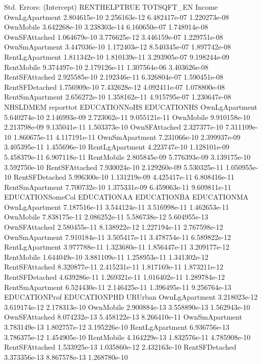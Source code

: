 \documentclass{article}
\begin{document}
\begin{Schunk}
\begin{Soutput}
Std. Errors:
                 (Intercept) RENTHELPTRUE   TOTSQFT_EN       Income
OwnLgApartment  2.804615e-10 2.256163e-12 6.482417e-07 1.220273e-08
OwnMobile       3.642268e-10 3.238303e-14 6.160650e-07 1.748914e-08
OwnSFAttached   1.064679e-10 3.776625e-12 3.446159e-07 1.229751e-08
OwnSmApartment  3.447036e-10 1.172403e-12 8.540345e-07 1.897742e-08
RentLgApartment 1.811342e-10 1.810139e-11 3.293905e-07 9.198244e-09
RentMobile      9.374497e-10 2.179126e-11 1.307564e-06 3.403626e-08
RentSFAttached  2.925585e-10 2.192346e-11 6.326804e-07 1.590451e-08
RentSFDetached  1.756909e-10 7.432628e-12 4.092411e-07 1.078800e-08
RentSmApartment 2.656272e-10 1.358162e-11 4.915795e-07 1.230647e-08
                    NHSLDMEM    reporttot EDUCATIONNoHS  EDUCATIONHS
OwnLgApartment  5.640274e-10 2.146993e-09  2.723062e-11 9.055121e-11
OwnMobile       9.910158e-10 2.213798e-09  9.135041e-11 1.503373e-10
OwnSFAttached   2.327377e-10 7.311109e-10  1.860675e-11 4.117191e-11
OwnSmApartment  7.231066e-10 2.399937e-09  3.405395e-11 1.455696e-10
RentLgApartment 4.223747e-10 1.128101e-09  5.458379e-11 6.907118e-11
RentMobile      2.805845e-09 5.776393e-09  3.139175e-10 3.592750e-10
RentSFAttached  7.930024e-10 2.129260e-09  5.530325e-11 1.050955e-10
RentSFDetached  5.996300e-10 1.131219e-09  4.425417e-11 6.808416e-11
RentSmApartment 7.700732e-10 1.375331e-09  6.459063e-11 9.609811e-11
                EDUCATIONSomeCol  EDUCATIONAA  EDUCATIONBA  EDUCATIONMA
OwnLgApartment      7.187516e-11 3.544124e-11 3.516998e-11 1.462653e-11
OwnMobile           7.838175e-11 2.086252e-11 5.586738e-12 5.604955e-13
OwnSFAttached       2.580455e-11 8.138922e-12 1.227194e-11 2.767598e-12
OwnSmApartment      7.910184e-11 3.505417e-11 3.478754e-11 6.589822e-12
RentLgApartment     3.977788e-11 1.323680e-11 1.856447e-11 3.209177e-12
RentMobile          1.644049e-10 3.881109e-11 1.258953e-11 1.341302e-12
RentSFAttached      8.320877e-11 2.415231e-11 1.817169e-11 1.873211e-12
RentSFDetached      4.639286e-11 1.269321e-11 1.016402e-11 1.289784e-12
RentSmApartment     6.524430e-11 2.146425e-11 1.396495e-11 9.256764e-13
                EDUCATIONProf EDUCATIONPHD      URUrban
OwnLgApartment   3.218023e-12 3.619174e-12 2.178313e-10
OwnMobile        2.900884e-13 3.558890e-13 1.562943e-10
OwnSFAttached    8.074232e-13 5.458122e-13 8.266410e-11
OwnSmApartment   3.783149e-13 1.802757e-12 3.195226e-10
RentLgApartment  6.936756e-13 3.786375e-12 1.454905e-10
RentMobile       4.164229e-13 1.832576e-11 4.785908e-10
RentSFAttached   1.533925e-13 1.035860e-12 2.432163e-10
RentSFDetached   3.373356e-13 8.867578e-13 1.268780e-10

\end{Soutput}
\end{Schunk}
\end{document}
